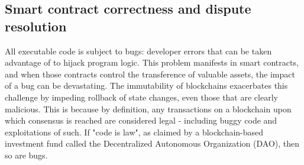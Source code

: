 
\subsection{Smart contract correctness and dispute resolution}
All executable code is subject to bugs: developer errors that can be taken advantage of to hijack program logic. This problem manifests in smart contracts, and when those contracts control the transference of valuable assets, the impact of a bug can be devastating. The immutability of blockchains exacerbates this challenge by impeding rollback of state changes, even those that are clearly malicious. This is because by definition, any transactions on a blockchain upon which consensus is reached are considered legal - including buggy code and exploitations of such. If "code is law", as claimed by a blockchain-based investment fund called the Decentralized Autonomous Organization (DAO), then so are bugs. 

